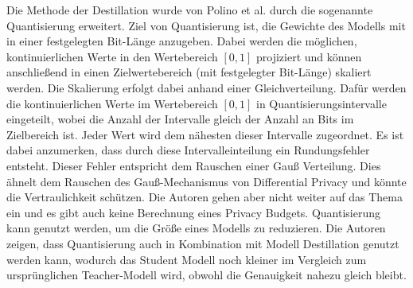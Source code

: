 Die Methode der Destillation wurde von Polino et al. \cite{P-62} durch die sogenannte Quantisierung erweitert.
Ziel von Quantisierung ist, die Gewichte des Modells mit in einer festgelegten Bit-Länge anzugeben.
Dabei werden die möglichen, kontinuierlichen Werte in den Wertebereich $[0,1]$ projiziert und können anschließend in einen Zielwertebereich (mit festgelegter Bit-Länge) skaliert werden.
Die Skalierung erfolgt dabei anhand einer Gleichverteilung.
Dafür werden die kontinuierlichen Werte im Wertebereich $[0,1]$ in Quantisierungsintervalle eingeteilt, wobei die Anzahl der Intervalle gleich der Anzahl an Bits im Zielbereich ist.
Jeder Wert wird dem nähesten dieser Intervalle zugeordnet.
Es ist dabei anzumerken, dass durch diese Intervalleinteilung ein Rundungsfehler entsteht.
Dieser Fehler entspricht dem Rauschen einer Gauß Verteilung.
Dies ähnelt dem Rauschen des Gauß-Mechanismus von Differential Privacy und könnte die Vertraulichkeit schützen.
Die Autoren gehen aber nicht weiter auf das Thema ein und es gibt auch keine Berechnung eines Privacy Budgets.
Quantisierung kann genutzt werden, um die Größe eines Modells zu reduzieren.
Die Autoren zeigen, dass Quantisierung auch in Kombination mit Modell Destillation genutzt werden kann, wodurch das Student Modell noch kleiner im Vergleich zum ursprünglichen Teacher-Modell wird, obwohl die Genauigkeit nahezu gleich bleibt.
